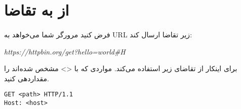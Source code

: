 \documentclass[../main.tex]{subfiles}
\begin{document}
\section{از  به تقاضا}

\paragraph{}
فرض کنید مرورگر شما می‌خواهد به URL زیر تقاضا ارسال کند:

\begin{latin}
\textit{https://httpbin.org/get?hello=world#H}
\end{latin}

برای اینکار از تقاضای زیر استفاده می‌کند. مواردی که با <> مشخص شده‌اند را مقداردهی کنید.

\begin{latin}
\begin{verbatim}
GET <path> HTTP/1.1
Host: <host>
\end{verbatim}
\end{latin}
\end{document}
